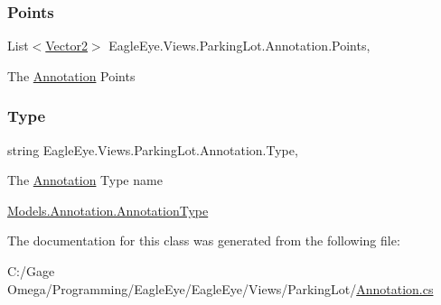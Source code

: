 \subsubsection{\texorpdfstring{Points}{Points}}
{\footnotesize\ttfamily List$<$\mbox{\hyperlink{class_eagle_eye_1_1_views_1_1_parking_lot_1_1_vector2}{Vector2}}$>$ Eagle\+Eye.\+Views.\+Parking\+Lot.\+Annotation.\+Points\hspace{0.3cm}{\ttfamily [get]}, {\ttfamily [set]}}



The \mbox{\hyperlink{class_eagle_eye_1_1_views_1_1_parking_lot_1_1_annotation}{Annotation}} Points 

\mbox{\label{class_eagle_eye_1_1_views_1_1_parking_lot_1_1_annotation_a90963e9e05db4da561e03dcea8cf1c8e}} 
\subsubsection{\texorpdfstring{Type}{Type}}
{\footnotesize\ttfamily string Eagle\+Eye.\+Views.\+Parking\+Lot.\+Annotation.\+Type\hspace{0.3cm}{\ttfamily [get]}, {\ttfamily [set]}}



The \mbox{\hyperlink{class_eagle_eye_1_1_views_1_1_parking_lot_1_1_annotation}{Annotation}} Type name 

\mbox{\hyperlink{class_eagle_eye_1_1_models_1_1_annotation_a38b72003ea887909fe12d6382092f7d9}{Models.\+Annotation.\+Annotation\+Type}} 

The documentation for this class was generated from the following file\+:\begin{DoxyCompactItemize}
\item 
C\+:/\+Gage Omega/\+Programming/\+Eagle\+Eye/\+Eagle\+Eye/\+Views/\+Parking\+Lot/\mbox{\hyperlink{_views_2_parking_lot_2_annotation_8cs}{Annotation.\+cs}}\end{DoxyCompactItemize}
